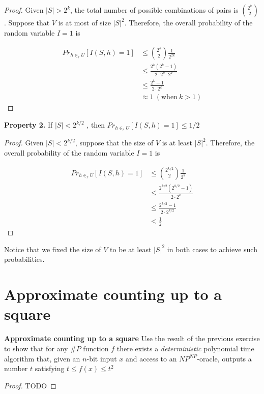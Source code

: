 \documentclass[12pt, a4paper]{article} %
\theoremstyle{definition}
\begin{document}
\begin{proof}


  Given $|S| >  2^k$, the total number of possible combinations of pairs is $\binom{2^k}{2}$.
  Suppose that $V$ is at most of size $|S|^2$.
  Therefore, the overall probability of the random variable $I = 1$ is

  \begin{align*}
    Pr_{h \in_r U} [I(S,h) = 1] &\leq \binom{2^k}{2}\frac{1}{2^{2k}}\\
                                &\leq \frac{2^k(2^k - 1)}{2 \cdot 2^k \cdot 2^k}\\
                                &\leq \frac{2^k - 1}{2 \cdot 2^k}\\
                                &\approx 1 \ (\text{when} \ k > 1)
  \end{align*}

\end{proof}

\textbf{Property 2.} \quad If $|S| < 2^{k/2}$ , then $Pr_{h \in_r U} [I(S,h) = 1] \leq 1/2$

\begin{proof}


  Given $|S| <  2^{k/2}$, suppose that the size of $V$ is at least $|S|^2$.
  Therefore, the overall probability of the random variable $I = 1$ is

  \begin{align*}
    Pr_{h \in_r U} [I(S,h) = 1] &\leq \binom{2^{k/2}}{2}\frac{1}{2^k}\\
                                &\leq \frac{2^{k/2}(2^{k/2} - 1)}{2 \cdot 2^k}\\
                                &\leq \frac{2^{k/2} - 1}{2 \cdot 2^{k/2}}\\
                                &< \frac{1}{2}
  \end{align*}


\end{proof}

Notice that we fixed the size of $V$ to be at least $|S|^2$ in both cases to achieve such probabilities.


\section{Approximate counting up to a square}

\textbf{Approximate counting up to a square} \quad Use the result of the previous exercise to show that for any $\#P$ function $f$ there exists a \textit{deterministic} polynomial time algorithm that, given an $n$-bit input $x$ and access to an $NP^{NP}$-oracle, outputs a number $t$ satisfying $t \leq f(x) \leq t^2$


\begin{proof}

  TODO

\end{proof}
\end{document}
